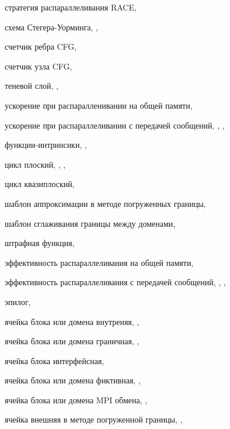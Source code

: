 стратегия распараллеливания RACE, \pageref{term:parallel_strategy_race}

схема Стегера-Уорминга, \pageref{term:steger_warming_scheme}, \pageref{term:steger_warming_scheme2}

счетчик ребра CFG, \pageref{term:counter_edge}

счетчик узла CFG, \pageref{term:counter_node}

теневой слой, \pageref{term:block_shadow_layer}, \pageref{term:block_shadow_layer2}

ускорение при распаралленивании на общей памяти, \pageref{term:shr_speedup}

ускорение при распараллеливании с передачей сообщений, \pageref{term:msg_speedup}, \pageref{term:msg_speedup2}, \pageref{term:msg_speedup3}

функции-интринсики, \pageref{term:intrinsic}, \pageref{term:intrinsic2}

цикл плоский, \pageref{term:flat_loop}, \pageref{term:flat_loop2}, \pageref{term:flat_loop3}

цикл квазиплоский, \pageref{term:flat_kvazy_flat}

шаблон аппроксимации в методе погруженных границы, \pageref{term:ibm_template}

шаблон сглаживания границы между доменами, \pageref{term:smooth_template}

штрафная функция, \pageref{term:penalty_function}

эффективность распараллеливания на общей памяти, \pageref{term:shr_eff}

эффективность распараллеливания с передачей сообщений, \pageref{term:msg_eff}, \pageref{term:msg_eff2}, \pageref{term:msg_eff3}

эпилог, \pageref{term:epilog}

ячейка блока или домена внутреняя, \pageref{term:cell_block_inner}, \pageref{term:cell_block_inner2}

ячейка блока или домена граничная, \pageref{term:cell_block_border}, \pageref{term:cell_block_border2}

ячейка блока интерфейсная, \pageref{term:cell_block_interface}

ячейка блока или домена фиктивная, \pageref{term:cell_block_ghost}, \pageref{term:cell_block_ghost2}

ячейка блока или домена MPI обмена, \pageref{term:cell_block_mpi}, \pageref{term:cell_block_mpi2}

ячейка внешняя в методе погруженной границы, \pageref{term:cell_ibm_outer}, \pageref{term:cell_ibm_outer2}

